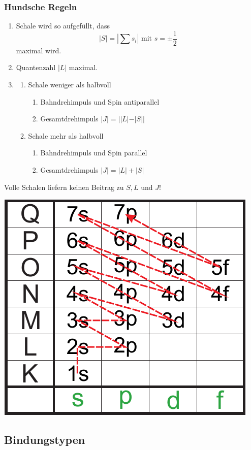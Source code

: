 \documentclass[a4paper,twocolumn,10pt]{article}
\begin{document}
\subsubsection{Hundsche Regeln}
\begin{enumerate}
\item Schale wird so aufgefüllt, dass
\begin{equation*}
|S|=\left|\sum s_i\right|\text{ mit }s=\pm \frac{1}{2}
\end{equation*}
maximal wird.
\item Quantenzahl $|L|$ maximal.
\item
\begin{enumerate}[label=$\bullet$]
\item Schale weniger als halbvoll
\begin{enumerate}[label=-]
\item Bahndrehimpuls und Spin antiparallel
\item Gesamtdrehimpuls $|J|=||L|-|S||$
\end{enumerate}
\item Schale mehr als halbvoll
\begin{enumerate}[label=-]
\item Bahndrehimpuls und Spin parallel
\item Gesamtdrehimpuls $|J|=|L|+|S|$
\end{enumerate}
\end{enumerate}
\end{enumerate}
Volle Schalen liefern keinen Beitrag zu $S,L$ und $J$!
\begin{center}
\includegraphics[width=0.6\columnwidth]{Grafiken/Hundsche_Regeln}
\end{center}

\subsection{Bindungstypen}
\end{document}
